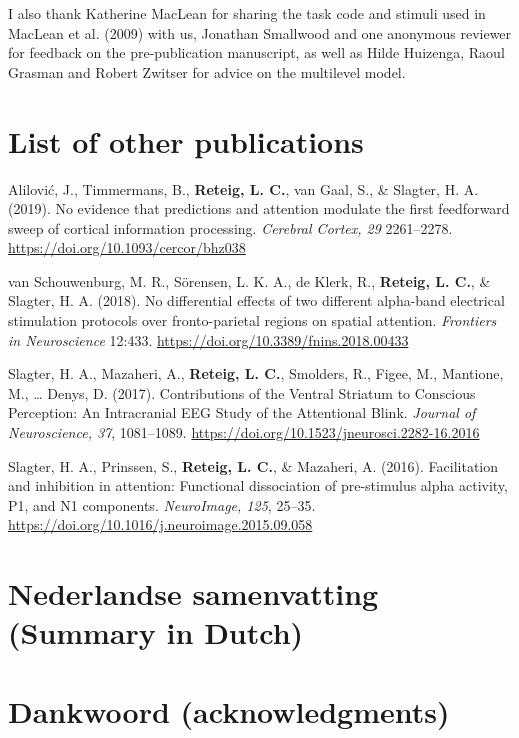 \documentclass[11pt,]{memoir}
\begin{document}
\begin{list}{}{\leftmargin=1.5em\rightmargin=0pt}
\item
I also thank Katherine MacLean for sharing the task code and stimuli used in MacLean et al. (2009) with us, Jonathan Smallwood and one anonymous reviewer for feedback on the pre-publication manuscript, as well as Hilde Huizenga, Raoul Grasman and Robert Zwitser for advice on the multilevel model.
\end{list}

\hypertarget{list-of-other-publications}{%
\chapter*{List of other publications}\label{list-of-other-publications}}


Alilović, J., Timmermans, B., \textbf{Reteig, L. C.}, van Gaal, S., \& Slagter, H. A. (2019). No evidence that predictions and attention modulate the first feedforward sweep of cortical information processing. \emph{Cerebral Cortex, 29} 2261--2278. \url{https://doi.org/10.1093/cercor/bhz038}\newline

van Schouwenburg, M. R., Sörensen, L. K. A., de Klerk, R., \textbf{Reteig, L. C.}, \& Slagter, H. A. (2018). No differential effects of two different alpha-band electrical stimulation protocols over fronto-parietal regions on spatial attention. \emph{Frontiers in Neuroscience} 12:433. \url{https://doi.org/10.3389/fnins.2018.00433}\newline

Slagter, H. A., Mazaheri, A., \textbf{Reteig, L. C.}, Smolders, R., Figee, M., Mantione, M., \ldots{} Denys, D. (2017). Contributions of the Ventral Striatum to Conscious Perception: An Intracranial EEG Study of the Attentional Blink. \emph{Journal of Neuroscience, 37}, 1081--1089. \url{https://doi.org/10.1523/jneurosci.2282-16.2016}\newline

Slagter, H. A., Prinssen, S., \textbf{Reteig, L. C.}, \& Mazaheri, A. (2016). Facilitation and inhibition in attention: Functional dissociation of pre-stimulus alpha activity, P1, and N1 components. \emph{NeuroImage, 125}, 25--35. \url{https://doi.org/10.1016/j.neuroimage.2015.09.058}

\hypertarget{nederlandse-samenvatting-summary-in-dutch}{%
\chapter{Nederlandse samenvatting (Summary in Dutch)}\label{nederlandse-samenvatting-summary-in-dutch}}

\hypertarget{dankwoord-acknowledgments}{%
\chapter{Dankwoord (acknowledgments)}\label{dankwoord-acknowledgments}}

\printbibliography
\end{document}
